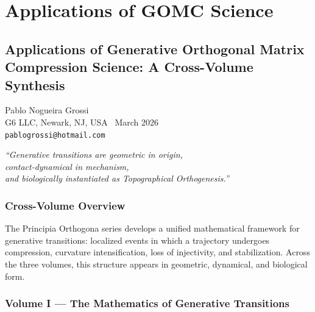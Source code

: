 \documentclass[12pt, oneside]{book}
\theoremstyle{plain}
\theoremstyle{definition}
\theoremstyle{remark}
\begin{document}
\part*{Applications of GOMC Science}

\chapter*{Applications of Generative Orthogonal Matrix Compression Science:
A Cross-Volume Synthesis}

\begin{center}
{\normalsize Pablo Nogueira Grossi}\\[0.3em]
{\small G6 LLC, Newark, NJ, USA \textperiodcentered\ March 2026}\\[0.3em]
{\small \texttt{pablogrossi@hotmail.com}}
\end{center}

\vspace{0.6cm}
\begin{center}
\itshape
``Generative transitions are geometric in origin,\\
contact-dynamical in mechanism,\\
and biologically instantiated as Topographical Orthogenesis.''
\end{center}
\vspace{0.4cm}

\section*{Cross-Volume Overview}

The Principia Orthogona series develops a unified mathematical framework for
generative transitions: localized events in which a trajectory undergoes
compression, curvature intensification, loss of injectivity, and stabilization.
Across the three volumes, this structure appears in geometric, dynamical, and
biological form.

\section*{Volume I --- The Mathematics of Generative Transitions}
\end{document}
